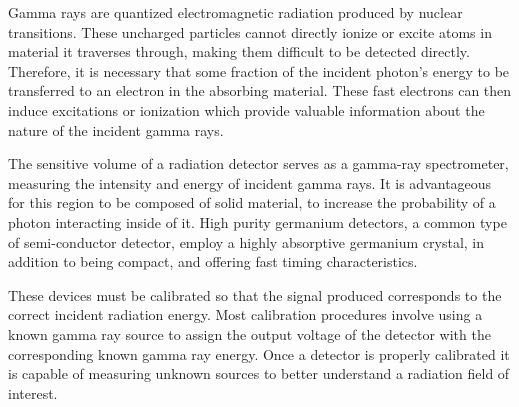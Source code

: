 
Gamma rays are quantized electromagnetic radiation produced
by nuclear transitions. These uncharged particles cannot directly ionize or
excite atoms in material it traverses through, making them difficult to be
detected directly. Therefore, it is necessary that some fraction of the incident
photon's energy to be transferred to an electron in the absorbing
material. These fast electrons can then induce excitations or ionization which
 provide valuable information about the nature of the incident gamma rays.

The sensitive volume of a radiation detector serves as a
gamma-ray spectrometer, measuring the intensity and energy of incident gamma rays.
It is advantageous for this region to be composed of solid material, to increase
the probability of a photon interacting inside of it. High purity germanium detectors,
a common type of semi-conductor detector, employ a highly absorptive germanium crystal,
 in addition to being compact, and offering
fast timing characteristics\cite{knoll}.

These devices must be calibrated so that the signal produced
corresponds to the correct incident radiation energy. Most calibration
procedures involve using a known gamma ray source to assign the output
voltage of the detector with the corresponding known gamma ray energy. Once
a detector is properly calibrated it is capable of measuring unknown sources
to better understand a radiation field of interest.
